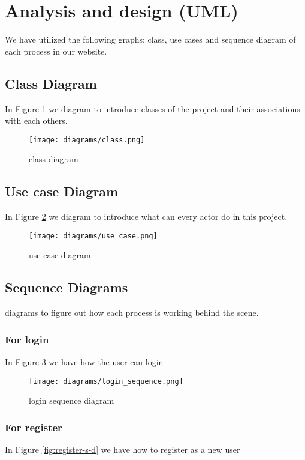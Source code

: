 \section{Analysis and design (UML)}
We have utilized the following graphs: class, use cases and sequence diagram of each process in our website.

	\subsection{Class Diagram}
	In Figure \ref{fig:class-d} we diagram to introduce classes of the project and their associations with each others.
	
		\begin{figure}[b]
			\centering
			\texttt{[image: diagrams/class.png]}
			\caption{class diagram}
			\label{fig:class-d}
		\end{figure}
	
	\subsection{Use case Diagram}
	In Figure \ref{fig:use-case-d} we diagram to introduce what can every actor do in this project.
	
		\begin{figure}[b]
			\centering
			\texttt{[image: diagrams/use\_case.png]}
			\caption{use case diagram}
			\label{fig:use-case-d}
		\end{figure}
	
	\subsection{Sequence Diagrams}
	diagrams to figure out how each process is working behind the scene.
	
	
	\subsubsection{For login}
	In Figure \ref{fig:login-s-d} we have how the user can login
	
		\begin{figure}[b]
			\centering
			\texttt{[image: diagrams/login\_sequence.png]}
			\caption{login sequence diagram}
			\label{fig:login-s-d}
		\end{figure}
	
	\subsubsection{For register}
	In Figure \ref{fig:register-s-d} we have how to register as a new user
	
